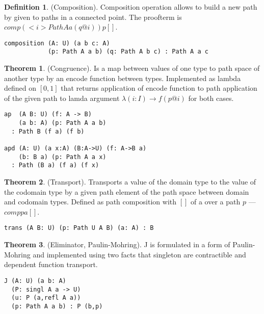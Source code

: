 \documentclass{article}
\theoremstyle{definition}
\newtheorem{definition}{Definition}
\newtheorem{theorem}{Theorem}
\begin{document}
\begin{definition} (Composition).
Composition operation allows to build a new path by given to paths
in a connected point. The proofterm is $comp (<i>Path A a (q@i)) p []$.
\begin{center}
\end{center}
\begin{lstlisting}
composition (A: U) (a b c: A)
            (p: Path A a b) (q: Path A b c) : Path A a c
\end{lstlisting}
\end{definition}

\begin{theorem} (Congruence).
Is a map between values of one type
to path space of another type by an encode function between types.
Implemented as lambda defined on $[0,1]$ that returns
application of encode function to path application of
the given path to lamda argument $\lambda(i:I)\rightarrow f (p @ i)$
for both cases.
\begin{lstlisting}
ap  (A B: U) (f: A -> B)
    (a b: A) (p: Path A a b)
  : Path B (f a) (f b)

apd (A: U) (a x:A) (B:A->U) (f: A->B a)
    (b: B a) (p: Path A a x)
  : Path (B a) (f a) (f x)
\end{lstlisting}
\end{theorem}

\begin{theorem} (Transport).
Transports a value of the domain type to the value of the codomain type
by a given path element of the path space between domain and codomain types.
Defined as path composition with $[]$ of a over a path $p$ --- $comp p a []$.
\begin{lstlisting}
trans (A B: U) (p: Path U A B) (a: A) : B
\end{lstlisting}
\end{theorem}


\begin{theorem} (Eliminator, Paulin-Mohring).
J is formulated in a form of Paulin-Mohring and implemented using
two facts that singleton are contractible and dependent function
transport.
\begin{lstlisting}
J (A: U) (a b: A)
  (P: singl A a -> U)
  (u: P (a,refl A a))
  (p: Path A a b) : P (b,p)
\end{lstlisting}
\end{theorem}
\end{document}
